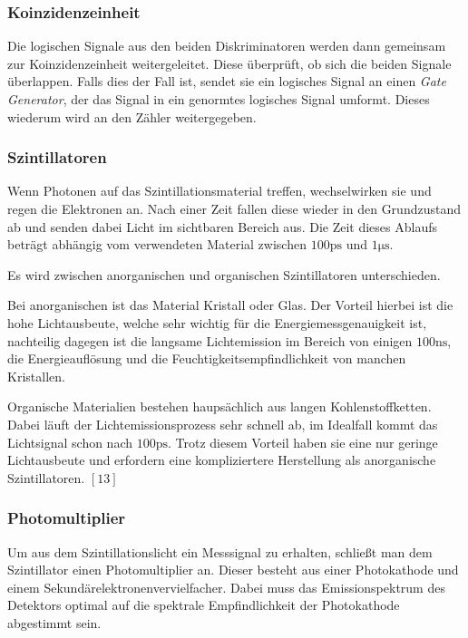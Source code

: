 \documentclass[12pt,a4paper]{scrartcl}
\numberwithin{equation}{section} %
\newcommand{\pu}[1]{\ensuremath{\mathrm{#1}}}
\renewcommand{\[}{} %
\renewcommand{\]}{\noindent} %
\begin{document}
\hypertarget{koinzidenzeinheit}{%
\subsubsection{Koinzidenzeinheit}\label{koinzidenzeinheit}}

Die logischen Signale aus den beiden Diskriminatoren werden dann
gemeinsam zur Koinzidenzeinheit weitergeleitet. Diese überprüft, ob sich
die beiden Signale überlappen. Falls dies der Fall ist, sendet sie ein
logisches Signal an einen \emph{Gate Generator}, der das Signal in ein
genormtes logisches Signal umformt. Dieses wiederum wird an den Zähler
weitergegeben.

\hypertarget{szintillatoren}{%
\subsubsection{Szintillatoren}\label{szintillatoren}}

Wenn Photonen auf das Szintillationsmaterial treffen, wechselwirken sie
und regen die Elektronen an. Nach einer Zeit fallen diese wieder in den
Grundzustand ab und senden dabei Licht im sichtbaren Bereich aus. Die
Zeit dieses Ablaufs beträgt abhängig vom verwendeten Material zwischen
\(\pu{100 ps}\) und \(\pu{1\mu s}\).

Es wird zwischen anorganischen und organischen Szintillatoren
unterschieden.

Bei anorganischen ist das Material Kristall oder Glas. Der Vorteil
hierbei ist die hohe Lichtausbeute, welche sehr wichtig für die
Energiemessgenauigkeit ist, nachteilig dagegen ist die langsame
Lichtemission im Bereich von einigen \(\pu{100 ns}\), die
Energieauflösung und die Feuchtigkeitsempfindlichkeit von manchen
Kristallen.

Organische Materialien bestehen haupsächlich aus langen
Kohlenstoffketten. Dabei läuft der Lichtemissionsprozess sehr schnell
ab, im Idealfall kommt das Lichtsignal schon nach \(\pu{100 ps}\). Trotz
diesem Vorteil haben sie eine nur geringe Lichtausbeute und erfordern
eine kompliziertere Herstellung als anorganische Szintillatoren.
\([13]\)

\hypertarget{photomultiplier}{%
\subsubsection{Photomultiplier}\label{photomultiplier}}

Um aus dem Szintillationslicht ein Messsignal zu erhalten, schließt man
dem Szintillator einen Photomultiplier an. Dieser besteht aus einer
Photokathode und einem Sekundärelektronenvervielfacher. Dabei muss das
Emissionspektrum des Detektors optimal auf die spektrale Empfindlichkeit
der Photokathode abgestimmt sein.
\end{document}
